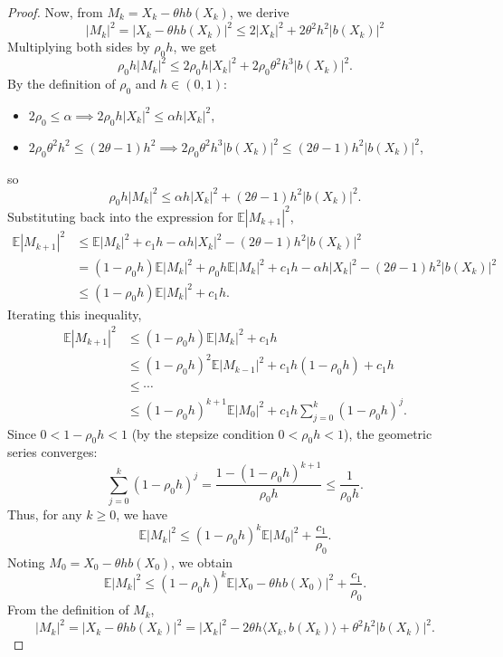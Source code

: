 \documentclass[10pt,a4paper]{amsart}
\begin{document}
\begin{proof}
Now, from $ M_k = X_k - \theta h b(X_k) $, we derive  
\[
|M_k|^2 = |X_k - \theta h b(X_k)|^2 \leq 2|X_k|^2 + 2\theta^2 h^2 |b(X_k)|^2 
\]  
Multiplying both sides by $ \rho_0 h $, we get  
\[
\rho_0 h |M_k|^2 \leq 2\rho_0 h |X_k|^2 + 2\rho_0 \theta^2 h^3 |b(X_k)|^2.
\]  
By the definition of $ \rho_0 $ and $h\in(0,1)$:  
\begin{itemize}
	\item $ 2\rho_0 \leq \alpha \implies 2\rho_0 h |X_k|^2 \leq \alpha h |X_k|^2 $,  
	\item $ 2\rho_0 \theta^2 h^2 \leq (2\theta - 1)h^2 \implies 2\rho_0 \theta^2 h^3 |b(X_k)|^2 \leq (2\theta - 1)h^2 |b(X_k)|^2 $,  
\end{itemize}
so  
\[
\rho_0 h |M_k|^2 \leq \alpha h |X_k|^2 + (2\theta - 1)h^2 |b(X_k)|^2.
\]  
Substituting back into the expression for $ \mathbb{E}|M_{k+1}|^2 $,  
\[
\begin{aligned}
	\mathbb{E}|M_{k+1}|^2 &\leq \mathbb{E}|M_k|^2 + c_1 h - \alpha h |X_k|^2 - (2\theta - 1)h^2 |b(X_k)|^2 \\
	&= (1-\rho_0 h)\mathbb{E}|M_k|^2 + \rho_0 h\mathbb{E}|M_k|^2 + c_1 h - \alpha h |X_k|^2 - (2\theta - 1)h^2 |b(X_k)|^2\ \\
	&\leq (1 - \rho_0 h) \mathbb{E}|M_k|^2 + c_1 h.
\end{aligned}
\]  
Iterating this inequality,  
\[
\begin{aligned}
	\mathbb{E}|M_{k+1}|^2 &\leq (1 - \rho_0 h) \mathbb{E}|M_k|^2 + c_1 h \\
	&\leq (1 - \rho_0 h)^2 \mathbb{E}|M_{k-1}|^2 + c_1 h (1 - \rho_0 h) + c_1 h \\
	&\leq \cdots \\
	&\leq (1 - \rho_0 h)^{k+1} \mathbb{E}|M_0|^2 + c_1 h \sum_{j=0}^k (1 - \rho_0 h)^j.
\end{aligned}
\]  
Since $ 0 < 1 - \rho_0 h < 1 $ (by the stepsize condition $ 0 < \rho_0 h < 1 $), the geometric series converges:  
\[
\sum_{j=0}^k (1 - \rho_0 h)^j = \frac{1 - (1 - \rho_0 h)^{k+1}}{\rho_0 h} \leq \frac{1}{\rho_0 h}.
\]  
Thus, for any $k \geq 0$, we have  
\[
\mathbb{E}|M_k|^2 \leq (1 - \rho_0 h)^k \mathbb{E}|M_0|^2 + \frac{c_1}{\rho_0}.
\]  
Noting $ M_0 = X_0 - \theta h b(X_0) $, we obtain  
\[
\mathbb{E}|M_k|^2 \leq (1 - \rho_0 h)^k \mathbb{E}|X_0 - \theta h b(X_0)|^2 + \frac{c_1}{\rho_0}.
\]  
From the definition of $ M_k $,  
\[
|M_k|^2 = |X_k - \theta h b(X_k)|^2 = |X_k|^2 - 2\theta h \langle X_k, b(X_k) \rangle + \theta^2 h^2 |b(X_k)|^2.
\]
\end{proof}
\end{document}
